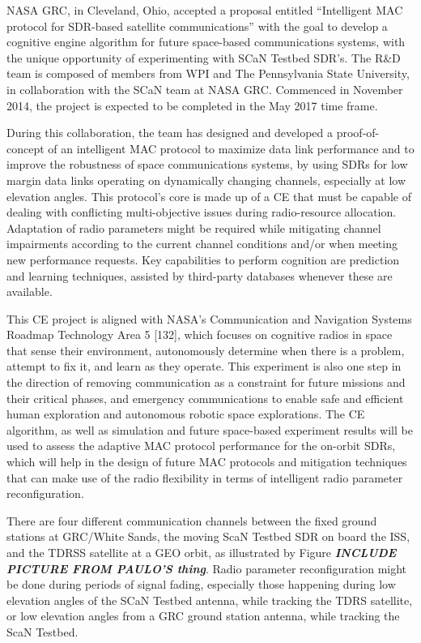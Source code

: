 \documentclass[11pt]{report}
\begin{document}
	\par NASA GRC, in Cleveland, Ohio, accepted a proposal entitled “Intelligent MAC protocol for SDR-based satellite communications” with the goal to develop a cognitive engine
	algorithm for future space-based communications systems, with the unique opportunity of experimenting with SCaN Testbed SDR’s. The R\&D team is composed of members from WPI and The Pennsylvania State University, in collaboration with the SCaN team at NASA GRC. Commenced in November 2014, the project is expected to be completed in the May 2017 time frame.
	\par During this collaboration, the team has designed and developed a proof-of-concept of an intelligent MAC protocol to maximize data link performance and to improve the robustness of space communications systems, by using SDRs for low margin data links operating on
	dynamically changing channels, especially at low elevation angles. This protocol’s core is made up of a CE that must be capable of dealing with conflicting multi-objective issues during radio-resource allocation. Adaptation of radio parameters might be required while mitigating channel impairments according to the current channel conditions and/or when meeting new performance requests. Key capabilities to perform cognition are prediction and learning techniques, assisted by third-party databases whenever these are available.
	\par This CE project is aligned with NASA’s Communication and Navigation Systems Roadmap Technology Area 5 [132], which focuses on cognitive radios in space that sense their environment, autonomously determine when there is a problem, attempt to fix it, and learn
	as they operate. This experiment is also one step in the direction of removing communication as a constraint for future missions and their critical phases, and emergency communications to enable safe and efficient human exploration and autonomous robotic space explorations.
	The CE algorithm, as well as simulation and future space-based experiment results will be used to assess the adaptive MAC protocol performance for the on-orbit SDRs, which will help in the design of future MAC protocols and mitigation techniques that can make use of
	the radio flexibility in terms of intelligent radio parameter reconfiguration.
	\par There are four different communication channels between the fixed ground stations at GRC/White Sands, the moving ScaN Testbed SDR on board the ISS, and the TDRSS satellite at a GEO orbit, as illustrated by Figure \textbf{\textit{INCLUDE PICTURE FROM PAULO'S thing}}. Radio parameter reconfiguration might be done during periods of signal fading, especially those happening during low elevation angles of the SCaN Testbed antenna, while tracking the TDRS satellite, or low elevation angles from a GRC ground station antenna, while tracking the ScaN Testbed.
\end{document}
